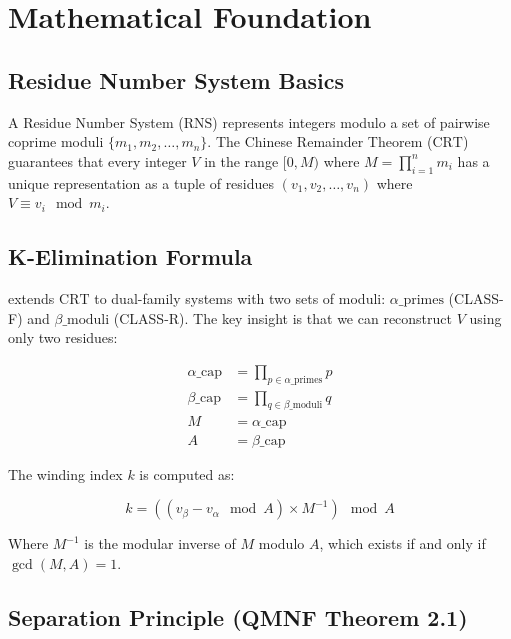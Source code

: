 \documentclass[11pt,letterpaper]{article}
\newcommand{\KElim}{\text{K-Elimination}}
\newcommand{\RNS}{\text{RNS}}
\newcommand{\CRT}{\text{CRT}}
\begin{document}
\newpage

\section{Mathematical Foundation}
\label{sec:mathematical-foundation}

\subsection{Residue Number System Basics}

A Residue Number System (\(\RNS\)) represents integers modulo a set of pairwise coprime moduli \(\{m_1, m_2, \ldots, m_n\}\). The Chinese Remainder Theorem (\(\CRT\)) guarantees that every integer \(V\) in the range \([0, M)\) where \(M = \prod_{i=1}^n m_i\) has a unique representation as a tuple of residues \((v_1, v_2, \ldots, v_n)\) where \(V \equiv v_i \mod m_i\).

\subsection{K-Elimination Formula}

\KElim\) extends \(\CRT\) to dual-family systems with two sets of moduli: \(\alpha\text{\_primes}\) (CLASS-F) and \(\beta\text{\_moduli}\) (CLASS-R). The key insight is that we can reconstruct \(V\) using only two residues:

\begin{equation}\label{eq:kelim-formula}
\begin{aligned}
\alpha\text{\_cap} &= \prod_{p \in \alpha\text{\_primes}} p \\
\beta\text{\_cap} &= \prod_{q \in \beta\text{\_moduli}} q \\
M &= \alpha\text{\_cap} \\
A &= \beta\text{\_cap}
\end{aligned}
\end{equation}

The winding index \(k\) is computed as:

\begin{equation}\label{eq:winding-index}
k = \left( (v_{\beta} - v_{\alpha} \mod A) \times M^{-1} \right) \mod A
\end{equation}

Where \(M^{-1}\) is the modular inverse of \(M\) modulo \(A\), which exists if and only if \(\gcd(M, A) = 1\).

\subsection{Separation Principle (QMNF Theorem 2.1)}
\end{document}
